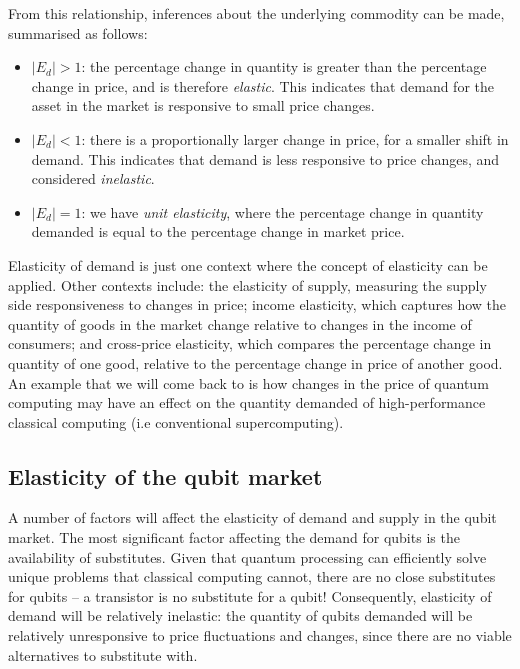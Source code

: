 From this relationship, inferences about the underlying commodity can be made, summarised as follows:
\begin{itemize}
	\item \mbox{$|E_d|>1$}: the percentage change in quantity is greater than the percentage change in price, and is therefore \textit{elastic}. This indicates that demand for the asset in the market is responsive to small price changes.
	\item \mbox{$|E_d|<1$}: there is a proportionally larger change in price, for a smaller shift in demand. This indicates that demand is less responsive to price changes, and considered \textit{inelastic}.
	\item \mbox{$|E_d|=1$}: we have \textit{unit elasticity}, where the percentage change in quantity demanded is equal to the percentage change in market price.
\end{itemize}

Elasticity of demand is just one context where the concept of elasticity can be applied. Other contexts include: the elasticity of supply, measuring the supply side responsiveness to changes in price; income elasticity, which captures how the quantity of goods in the market change relative to changes in the income of consumers; and cross-price elasticity, which compares the percentage change in quantity of one good, relative to the percentage change in price of another good. An example that we will come back to is how changes in the price of quantum computing may have an effect on the quantity demanded of high-performance classical computing (i.e conventional supercomputing).

\subsection{Elasticity of the qubit market}

A number of factors will affect the elasticity of demand and supply in the qubit market. The most significant factor affecting the demand for qubits is the availability of substitutes. Given that quantum processing can efficiently solve unique problems that classical computing cannot, there are no close substitutes for qubits -- a transistor is no substitute for a qubit! Consequently, elasticity of demand will be relatively inelastic: the quantity of qubits demanded will be relatively unresponsive to price fluctuations and changes, since there are no viable alternatives to substitute with. 

